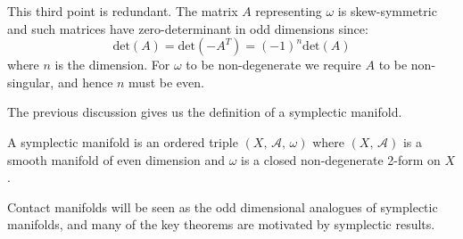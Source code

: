 This third point is redundant. The matrix $A$ representing $\omega$ is
skew-symmetric and such matrices have zero-determinant in odd dimensions
since:
\begin{equation}
    \textrm{det}(A)=\textrm{det}(-A^{T})=(-1)^{n}\textrm{det}(A)
\end{equation}
where $n$ is the dimension. For $\omega$ to be non-degenerate we require $A$
to be non-singular, and hence $n$ must be even.
\par\hfill\par
The previous discussion gives us the definition of a symplectic manifold.
\begin{definition}
    A symplectic manifold is an ordered triple $(X,\,\mathcal{A},\,\omega)$
    where $(X,\,\mathcal{A})$ is a smooth manifold of even dimension and
    $\omega$ is a closed non-degenerate 2-form on $X$.
\end{definition}
Contact manifolds will be seen as the odd dimensional analogues of symplectic
manifolds, and many of the key theorems are motivated by symplectic results.
